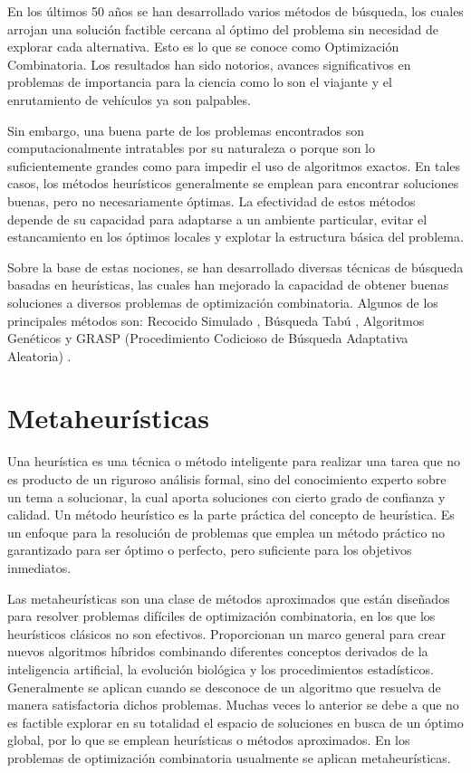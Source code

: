 \documentclass[a4paper,openright,11pt,oneside]{book}
\begin{document}
	En los últimos 50 años se han desarrollado varios métodos de búsqueda, los cuales arrojan una solución factible cercana al óptimo del problema sin necesidad de explorar cada alternativa. Esto es lo que se conoce como Optimización Combinatoria. Los resultados han sido notorios, avances significativos en problemas de importancia para la ciencia como lo son el viajante y el enrutamiento de vehículos ya son palpables.
	
	Sin embargo, una buena parte de los problemas encontrados son computacionalmente intratables por su naturaleza o porque son lo suficientemente grandes como para impedir el uso de algoritmos exactos. En tales casos, los métodos heurísticos generalmente se emplean para encontrar soluciones buenas, pero no necesariamente óptimas. La efectividad de estos métodos depende de su capacidad para adaptarse a un ambiente particular, evitar el estancamiento en los óptimos locales y explotar la estructura básica del problema.
	
	Sobre la base de estas nociones, se han desarrollado diversas técnicas de búsqueda basadas en heurísticas, las cuales han mejorado la capacidad de obtener buenas soluciones a diversos problemas de optimización combinatoria. Algunos de los principales métodos son: Recocido Simulado \cite{dowsland2003diseno}, Búsqueda Tabú \cite{cunquero2003algoritmos}, Algoritmos Genéticos \cite{jimenez2009busquedas} y GRASP (Procedimiento Codicioso de Búsqueda Adaptativa Aleatoria) \cite{resende2003grasp}.
	
	\section{Metaheurísticas}
	
	Una heurística \cite{gonzalez2001evaluacion} es una técnica o método inteligente para realizar una tarea que no es producto de un riguroso análisis formal, sino del conocimiento experto sobre un tema a solucionar, la cual aporta soluciones con cierto grado de confianza y calidad. Un método heurístico es la parte práctica del concepto de heurística. Es un enfoque para la resolución de problemas que emplea un método práctico no garantizado para ser óptimo o perfecto, pero suficiente para los objetivos inmediatos.
	
	Las metaheurísticas \cite{yagiura2001metaheuristic} son una clase de métodos aproximados que están diseñados para resolver problemas difíciles de optimización combinatoria, en los que los heurísticos clásicos no son efectivos. Proporcionan un marco general para crear nuevos algoritmos híbridos combinando diferentes conceptos derivados de la inteligencia artificial, la evolución biológica y los procedimientos estadísticos. Generalmente se aplican cuando se desconoce de un algoritmo que resuelva de manera satisfactoria dichos problemas. Muchas veces lo anterior se debe a que no es factible explorar en su totalidad el espacio de soluciones en busca de un óptimo global, por lo que se emplean heurísticas o métodos aproximados. En los problemas de optimización combinatoria \cite{gandomi2013metaheuristic} usualmente se aplican metaheurísticas. \\
	
\end{document}
